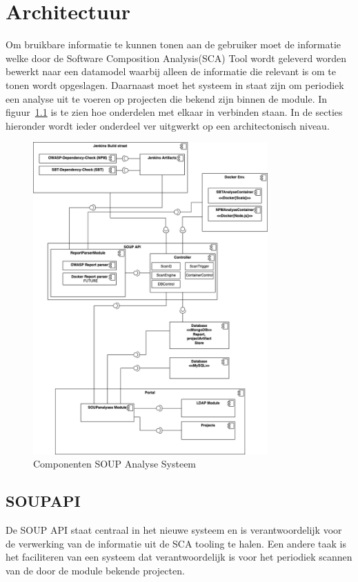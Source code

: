 \chapter{Architectuur}\label{ch:Architectuur}
Om bruikbare informatie te kunnen tonen aan de gebruiker moet de informatie welke door de Software Composition Analysis(SCA) Tool wordt geleverd worden bewerkt naar een datamodel waarbij alleen de informatie die relevant is om te tonen wordt opgeslagen. Daarnaast moet het systeem in staat zijn om periodiek een analyse uit te voeren op projecten die bekend zijn binnen de module. In figuur~\ref{fig:SOUP-Components} is te zien hoe onderdelen met elkaar in verbinden staan.
In de secties hieronder wordt ieder onderdeel ver uitgwerkt op een architectonisch niveau.

\begin{figure}[bth]
    \myfloatalign
    \includegraphics[width=9cm]{gfx/UMLcomponentDiagram}
    \caption{Componenten SOUP Analyse Systeem}
    \label{fig:SOUP-Components}
\end{figure}


\section{SOUPAPI}\label{sec:soupapi}
De SOUP API staat centraal in het nieuwe systeem en is verantwoordelijk voor de verwerking van de informatie uit de SCA tooling te halen. Een andere taak is het faciliteren van een systeem dat verantwoordelijk is voor het periodiek scannen van de door de module bekende projecten.

